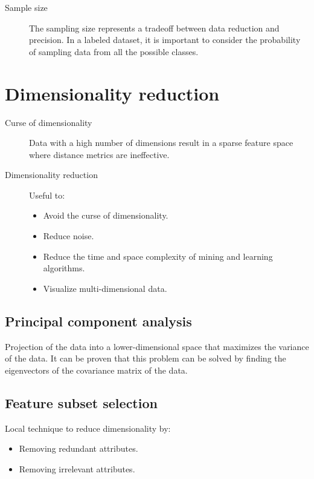 \begin{description}
    \item[Sample size]
        The sampling size represents a tradeoff between data reduction and precision.
        In a labeled dataset, it is important to consider the probability of sampling data from all the possible classes.
\end{description}



\section{Dimensionality reduction}

\begin{description}
    \item[Curse of dimensionality] 
        Data with a high number of dimensions result in a sparse feature space
        where distance metrics are ineffective. 

    \item[Dimensionality reduction] 
        Useful to:
        \begin{itemize}
            \item Avoid the curse of dimensionality.
            \item Reduce noise.
            \item Reduce the time and space complexity of mining and learning algorithms.
            \item Visualize multi-dimensional data.
        \end{itemize}
\end{description}

\subsection{Principal component analysis}  
Projection of the data into a lower-dimensional space that maximizes the variance of the data.
It can be proven that this problem can be solved by finding the eigenvectors of the covariance matrix of the data.

\subsection{Feature subset selection}  
    Local technique to reduce dimensionality by:
    \begin{itemize}
        \item Removing redundant attributes.
        \item Removing irrelevant attributes.
    \end{itemize}

